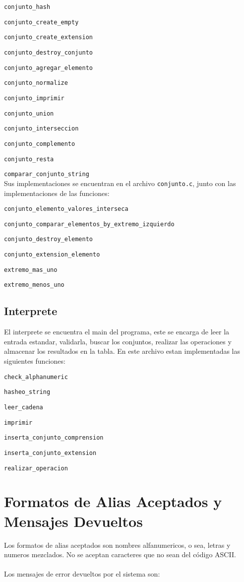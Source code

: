 \documentclass[]{article}
\begin{document}
\verb|conjunto_hash|

\verb|conjunto_create_empty|

\verb|conjunto_create_extension|

\verb|conjunto_destroy_conjunto|

\verb|conjunto_agregar_elemento|

\verb|conjunto_normalize|

\verb|conjunto_imprimir|

\verb|conjunto_union|

\verb|conjunto_interseccion|

\verb|conjunto_complemento|

\verb|conjunto_resta|

\verb|comparar_conjunto_string|\\
Sus implementaciones se encuentran en el archivo \verb|conjunto.c|, junto con las implementaciones de las funciones:

\verb|conjunto_elemento_valores_interseca|

\verb|conjunto_comparar_elementos_by_extremo_izquierdo|

\verb|conjunto_destroy_elemento|

\verb|conjunto_extension_elemento|

\verb|extremo_mas_uno|

\verb|extremo_menos_uno|

\newpage
\subsection{Interprete}
El interprete se encuentra el main del programa, este se encarga de leer la entrada estandar, validarla, buscar los conjuntos, realizar las operaciones y almacenar los resultados en la tabla. En este archivo estan implementadas las siguientes funciones:

\verb|check_alphanumeric|

\verb|hasheo_string|

\verb|leer_cadena|

\verb|imprimir|

\verb|inserta_conjunto_comprension|

\verb|inserta_conjunto_extension|

\verb|realizar_operacion|

\section{Formatos de Alias Aceptados y Mensajes Devueltos}
Los formatos de alias aceptados son nombres alfanumericos, o sea, letras y numeros mezclados. No se aceptan caracteres que no sean del código ASCII.
\\\\
Los mensajes de error devueltos por el sistema son:
\end{document}
